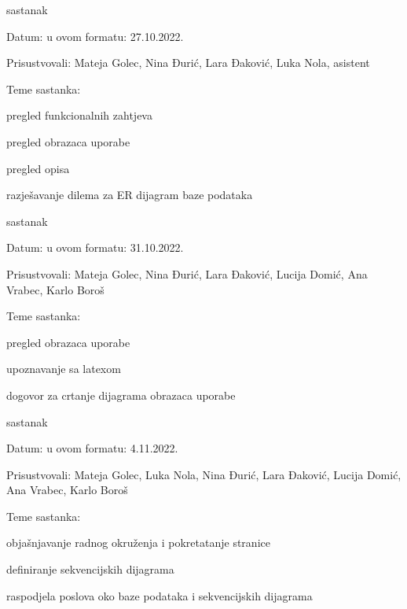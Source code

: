 \begin{packed_enum}
			\item  sastanak
			\item[] \begin{packed_item}
				\item Datum: u ovom formatu: 27.10.2022.
				\item Prisustvovali: Mateja Golec, Nina Đurić, Lara Đaković, Luka Nola, asistent
				\item Teme sastanka:
				\begin{packed_item}
					\item  pregled funkcionalnih zahtjeva
					\item  pregled obrazaca uporabe
					\item  pregled opisa
					\item  razješavanje dilema za ER dijagram baze podataka
				\end{packed_item}
			\end{packed_item}

			\item  sastanak
			\item[] \begin{packed_item}
				\item Datum: u ovom formatu: 31.10.2022.
				\item Prisustvovali: Mateja Golec, Nina Đurić, Lara Đaković, Lucija Domić, Ana Vrabec, Karlo Boroš
				\item Teme sastanka:
				\begin{packed_item}
					\item  pregled obrazaca uporabe
					\item  upoznavanje sa latexom
					\item  dogovor za crtanje dijagrama obrazaca uporabe
				\end{packed_item}
			\end{packed_item}

			\item  sastanak
			\item[] \begin{packed_item}
				\item Datum: u ovom formatu: 4.11.2022.
				\item Prisustvovali: Mateja Golec, Luka Nola, Nina Đurić, Lara Đaković, Lucija Domić, Ana Vrabec, Karlo Boroš
				\item Teme sastanka:
				\begin{packed_item}
					\item  objašnjavanje radnog okruženja i pokretatanje stranice
					\item  definiranje sekvencijskih dijagrama
					\item  raspodjela poslova oko baze podataka i sekvencijskih dijagrama
				\end{packed_item}
			\end{packed_item}
		
			
		\end{packed_enum}
		

